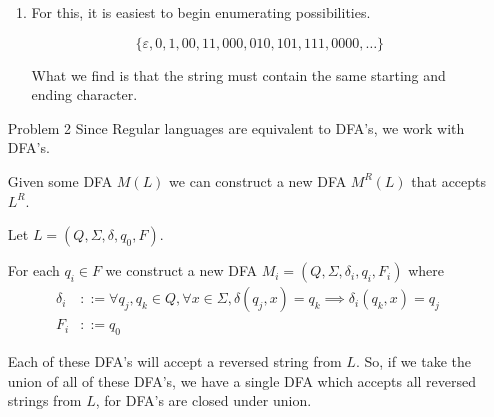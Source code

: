 \documentclass[12pt,letterpaper]{article}
\begin{document}
\begin{enumerate}
\begin{enumerate}
        \item
          For this, it is easiest to begin enumerating possibilities.

          \[\{\varepsilon , 0, 1, 00, 11, 000, 010, 101, 111, 0000, \dots\}\]

          What we find is that the string must contain the same starting and ending character.

      \end{enumerate}

    \item[Problem 2]
      Since Regular languages are equivalent to DFA's, we work with DFA's.

      Given some DFA $M(L)$ we can construct a new DFA $M^R(L)$ that accepts $L^R$.

      Let $L = (Q, \Sigma, \delta, q_0, F)$.

      For each $q_i \in F$ we construct a new DFA $M_i = (Q, \Sigma, \delta_i, q_i, F_i)$
      where
      \begin{align*}
        \delta_i &::= \forall q_j, q_k \in Q, \forall x \in \Sigma, \delta(q_j, x) = q_k \implies \delta_i(q_k, x) = q_j \\
        F_i &::= {q_0}
      \end{align*}

      Each of these DFA's will accept a reversed string from $L$.
      So, if we take the union of all of these DFA's,
      we have a single DFA which accepts all reversed strings from $L$, for DFA's are closed under union.


\end{enumerate}
\end{document}
